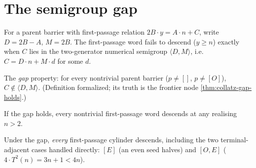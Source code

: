 \section{The semigroup gap}

\begin{theorem}
  \label{thm:collatz-nondescent-iff}
  \leanok
  For a parent barrier with first-passage relation $2B\cdot y=A\cdot n+C$, write $D=2B-A$,
  $M=2B$. The first-passage word fails to descend ($y\ge n$) exactly when $C$ lies in the
  two-generator numerical semigroup $\langle D,M\rangle$, i.e. $C=D\cdot n+M\cdot d$ for some
  $d$.
\end{theorem}
\begin{proposition}
  \label{thm:collatz-gap}
  \leanok
  The \emph{gap} property: for every nontrivial parent barrier ($p\ne[]$, $p\ne[O]$), $C\notin
  \langle D,M\rangle$. (Definition formalized; its truth is the frontier node
  \cref{thm:collatz-gap-holds}.)
\end{proposition}
\begin{theorem}
  \label{thm:collatz-gap-implies-descent}
  \leanok
  If the gap holds, every nontrivial first-passage word descends at any realising $n>2$.
\end{theorem}
\begin{theorem}
  \label{thm:collatz-all-firstpassage-descent}
  \leanok
  Under the gap, \emph{every} first-passage cylinder descends, including the two
  terminal-adjacent cases handled directly: $[E]$ (an even seed halves) and $[O,E]$
  ($4\cdot T^2(n)=3n+1<4n$).
\end{theorem}
